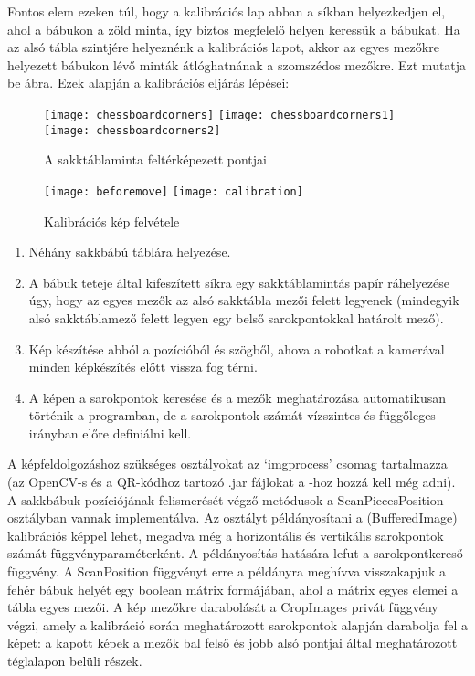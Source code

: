 \documentclass[../documentation.tex]{subfiles}
\begin{document}
Fontos elem ezeken túl, hogy a kalibrációs lap abban a síkban helyezkedjen el, ahol a bábukon a zöld minta, így biztos megfelelő helyen keressük a bábukat. Ha az alsó tábla szintjére helyeznénk a kalibrációs lapot, akkor az egyes mezőkre helyezett bábukon lévő minták átlóghatnának a szomszédos mezőkre. Ezt mutatja be  ábra.
Ezek alapján a kalibrációs eljárás lépései:
\begin{figure}
\centering
\texttt{[image: chessboardcorners]}
\texttt{[image: chessboardcorners1]}
\texttt{[image: chessboardcorners2]}
\caption{A sakktáblaminta feltérképezett pontjai}
\label{fig:chessboardcorners}
\end{figure}
\begin{figure}
\centering
\texttt{[image: beforemove]}
\texttt{[image: calibration]}
\caption{Kalibrációs kép felvétele}
\label{fig:chessboardcalibration}
\end{figure}
\begin{enumerate}
	\item Néhány sakkbábú táblára helyezése.
	\item A bábuk teteje által kifeszített síkra egy sakktáblamintás papír ráhelyezése úgy, hogy az egyes mezők az alsó sakktábla mezői felett legyenek (mindegyik alsó sakktáblamező felett legyen egy belső sarokpontokkal határolt mező).
	\item Kép készítése abból a pozícióból és szögből, ahova a robotkat a kamerával minden képkészítés előtt vissza fog térni.
	\item A képen a sarokpontok keresése és a mezők meghatározása automatikusan történik a programban, de a sarokpontok számát vízszintes és függőleges irányban előre definiálni kell.
\end{enumerate}

A képfeldolgozáshoz szükséges osztályokat az `imgprocess' csomag tartalmazza (az OpenCV-s és a QR-kódhoz tartozó .jar fájlokat a -hoz hozzá kell még adni). A sakkbábuk pozíciójának felismerését végző metódusok a ScanPiecesPosition osztályban vannak implementálva. Az osztályt példányosítani a (BufferedImage) kalibrációs képpel lehet, megadva még a horizontális és vertikális sarokpontok számát függvényparaméterként. A példányosítás hatására lefut a sarokpontkereső függvény. A ScanPosition függvényt erre a példányra meghívva visszakapjuk a fehér bábuk helyét egy boolean mátrix formájában, ahol a mátrix egyes elemei a tábla egyes mezői. A kép mezőkre darabolását a CropImages privát függvény végzi, amely a kalibráció során meghatározott sarokpontok alapján darabolja fel a képet: a kapott képek a mezők bal felső és jobb alsó pontjai által meghatározott téglalapon belüli részek.
\end{document}
